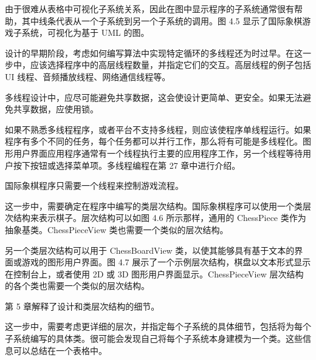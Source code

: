 由于很难从表格中可视化子系统关系，因此在图中显示程序的子系统通常很有帮助，其中线条代表从一个子系统到另一个子系统的调用。图 4.5 显示了国际象棋游戏子系统，可视化为基于 UML 的图。



设计的早期阶段，考虑如何编写算法中实现特定循环的多线程还为时过早。在这一步中，应该选择程序中的高层线程数量，并指定它们的交互。高层线程的例子包括 UI 线程、音频播放线程、网络通信线程等。

多线程设计中，应尽可能避免共享数据，这会使设计更简单、更安全。如果无法避免共享数据，应使用锁。

如果不熟悉多线程程序，或者平台不支持多线程，则应该使程序单线程运行。如果程序有多个不同的任务，每个任务都可以并行工作，那么将有可能是多线程化。图形用户界面应用程序通常有一个线程执行主要的应用程序工作，另一个线程等待用户按下按钮或选择菜单项。多线程编程在第 27 章中进行介绍。

国际象棋程序只需要一个线程来控制游戏流程。


这一步中，需要确定在程序中编写的类层次结构。国际象棋程序可以使用一个类层次结构来表示棋子。层次结构可以如图 4.6 所示那样，通用的 ChessPiece 类作为抽象基类。ChessPieceView 类也需要一个类似的层次结构。


另一个类层次结构可以用于 ChessBoardView 类，以使其能够具有基于文本的界面或游戏的图形用户界面。图 4.7 展示了一个示例层次结构，棋盘以文本形式显示在控制台上，或者使用 2D 或 3D 图形用户界面显示。ChessPieceView 层次结构的各个类也需要一个类似的层次结构。


第 5 章解释了设计和类层次结构的细节。


这一步中，需要考虑更详细的层次，并指定每个子系统的具体细节，包括将为每个子系统编写的具体类。很可能会发现自己将每个子系统本身建模为一个类。这些信息可以总结在一个表格中。

